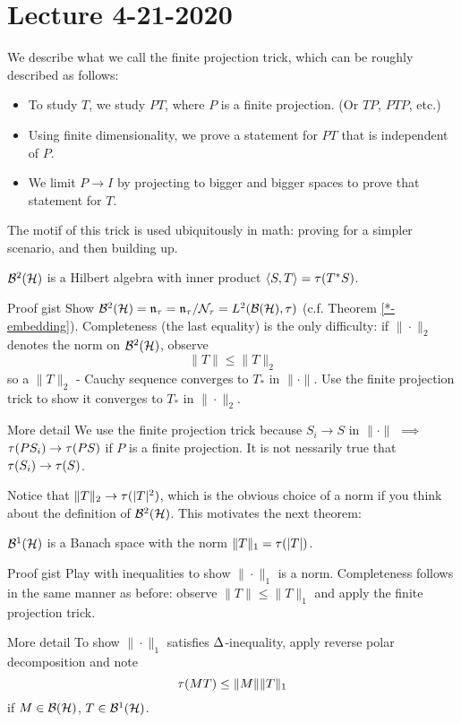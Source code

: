 \section{Lecture 4-21-2020}
We describe what we call the finite projection trick, which can be roughly described as follows:
\begin{itemize}
    \item To study $T$, we study $PT$, where $P$ is a finite projection. (Or $TP$, $PTP$, etc.)
    \item Using finite dimensionality, we prove a statement for $PT$ that is independent of $P$.
    \item We limit $P \rightarrow I$ by projecting to bigger and bigger spaces to prove that statement for $T$.
\end{itemize}
\begin{remark}
    The motif of this trick is used ubiquitously in math: proving for a simpler scenario, and then building up.
\end{remark}

\begin{thm}
    ${\mathcal B}^2({\mathcal H})$ is a Hilbert algebra with inner product $ \langle S, T \rangle = \tau(T^*S)$.
\end{thm}
\begin{details}{Proof gist}
    Show ${\mathcal B}^2({\mathcal H}) = \mathfrak n_\tau = \mathfrak n_\tau /{\mathcal N}_\tau = L^2({\mathcal B}({\mathcal H}), \tau)$ (c.f. Theorem \ref{*-embedding}). Completeness (the last equality) is the only difficulty: if $\|\cdot\|_2$ denotes the norm on ${\mathcal B}^2({\mathcal H})$, observe
    \[
        \|T\| \leq \|T\|_2
    \]
    so a $\|T\|_2$ - Cauchy sequence converges to $T_*$ in $\|\cdot\|$. Use the finite projection trick to show it converges to $T_*$ in $\|\cdot\|_2$.
\end{details}
\begin{details}{More detail}
    We use the finite projection trick because $S_i \rightarrow S$ in $\|\cdot\|$ $\implies$ $\tau(PS_i) \rightarrow \tau(PS)$ if $P$ is a finite projection. It is not nessarily true that $\tau(S_i) \rightarrow \tau(S)$.
\end{details}
Notice that $\|T\|_2 \rightarrow \tau(|T|^2)$, which is the obvious choice of a norm if you think about the definition of ${\mathcal B}^2({\mathcal H})$. This motivates the next theorem:
\begin{thm}
    ${\mathcal B}^1({\mathcal H})$ is a Banach space with the norm $\|T\|_1 = \tau(|T|)$.
\end{thm}
\begin{details}{Proof gist}
    Play with inequalities to show $\|\cdot\|_1$ is a norm. Completeness follows in the same manner as before: observe $\|T\| \leq \|T\|_1$ and apply the finite projection trick.
\end{details}
\begin{details}{More detail}
    To show $\|\cdot\|_1$ satisfies $\Delta$-inequality, apply reverse polar decomposition and note 
    \[
        \tau(MT) \leq \|M\|\|T\|_1
    \]
    if $M \in {\mathcal B}({\mathcal H})$, $T \in {\mathcal B}^1({\mathcal H})$.
\end{details}

